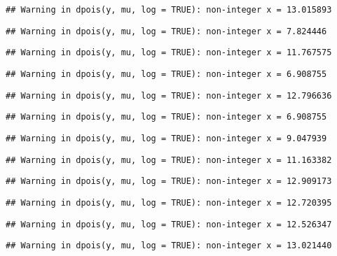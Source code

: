 \documentclass[
]{article}
\begin{document}
\begin{verbatim}
## Warning in dpois(y, mu, log = TRUE): non-integer x = 13.015893
\end{verbatim}

\begin{verbatim}
## Warning in dpois(y, mu, log = TRUE): non-integer x = 7.824446
\end{verbatim}

\begin{verbatim}
## Warning in dpois(y, mu, log = TRUE): non-integer x = 11.767575
\end{verbatim}

\begin{verbatim}
## Warning in dpois(y, mu, log = TRUE): non-integer x = 6.908755
\end{verbatim}

\begin{verbatim}
## Warning in dpois(y, mu, log = TRUE): non-integer x = 12.796636
\end{verbatim}

\begin{verbatim}
## Warning in dpois(y, mu, log = TRUE): non-integer x = 6.908755
\end{verbatim}

\begin{verbatim}
## Warning in dpois(y, mu, log = TRUE): non-integer x = 9.047939
\end{verbatim}

\begin{verbatim}
## Warning in dpois(y, mu, log = TRUE): non-integer x = 11.163382
\end{verbatim}

\begin{verbatim}
## Warning in dpois(y, mu, log = TRUE): non-integer x = 12.909173
\end{verbatim}

\begin{verbatim}
## Warning in dpois(y, mu, log = TRUE): non-integer x = 12.720395
\end{verbatim}

\begin{verbatim}
## Warning in dpois(y, mu, log = TRUE): non-integer x = 12.526347
\end{verbatim}

\begin{verbatim}
## Warning in dpois(y, mu, log = TRUE): non-integer x = 13.021440
\end{verbatim}
\end{document}
